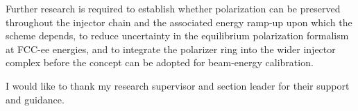\documentclass[%
 aip,
 amsmath,amssymb,
 reprint,%
superscriptaddress
]{revtex4-2}
\begin{document}
Further research is required to establish whether polarization can be preserved throughout the injector chain and the associated energy ramp-up upon which the scheme depends, to reduce uncertainty in the equilibrium polarization formalism at FCC-ee energies, and to integrate the polarizer ring into the wider injector complex before the concept can be adopted for beam-energy calibration.
\begin{acknowledgments}

I would like to thank my research supervisor
  and section leader for their support and guidance.

\end{acknowledgments}


\end{document}
